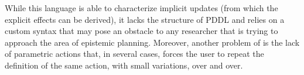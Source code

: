 While this language is able to characterize implicit \knobel updates (from which the explicit effects can be derived), it lacks the structure of PDDL and relies on a custom syntax that may pose an obstacle to any researcher that is trying to approach the area of epistemic planning.
Moreover, another problem of \mar is the lack of parametric actions that, in several cases, forces the user to repeat the definition of the same action, with small variations, over and over.%